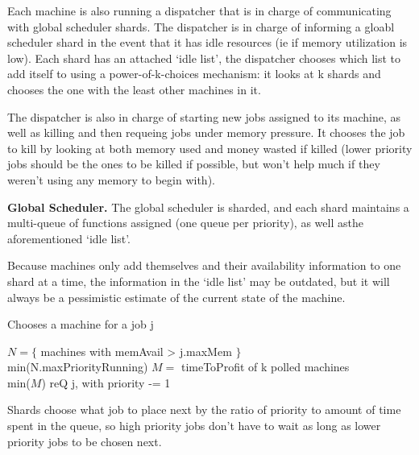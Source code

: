 Each machine is also running a dispatcher that is in charge of communicating
with global scheduler shards. The dispatcher is in charge of informing a gloabl
scheduler shard in the event that it has idle resources (ie if memory
utilization is low). Each shard has an attached `idle list', the dispatcher
chooses which list to add itself to using a power-of-k-choices mechanism: it
looks at k shards and chooses the one with the least other machines in it. 

The dispatcher is also in charge of starting new jobs assigned to its machine,
as well as killing and then requeing jobs under memory pressure. It chooses the
job to kill by looking at both memory used and money wasted if killed (lower
priority jobs should be the ones to be killed if possible, but won't help much
if they weren't using any memory to begin with).



\textbf{Global Scheduler.}
The global scheduler is sharded, and each shard maintains a multi-queue of
functions assigned (one queue per priority), as well asthe aforementioned `idle list'. 

Because machines only add themselves and their availability information to one
shard at a time, the information in the `idle list' may be outdated, but it will
always be a pessimistic estimate of the current state of the machine.

\begin{algorithm}[ht!]
\caption{Chooses a machine for a job j}\label{alg:place}
\begin{algorithmic}
    \State$N = \{ $ machines with memAvail > j.maxMem $\}$
     \\
        \Return$ $min(N.maxPriorityRunning)
    \EndIf
    \State$M = $ timeToProfit of k polled machines
     \\
        \Return$ $min($M$)
    \Else
        \State$ $reQ j, with priority -= 1
    \EndIf
\end{algorithmic}
\end{algorithm}

Shards choose what job to place next by the ratio of priority to amount of
time spent in the queue, so high priority jobs don't have to wait as long
as lower priority jobs to be chosen next. 

